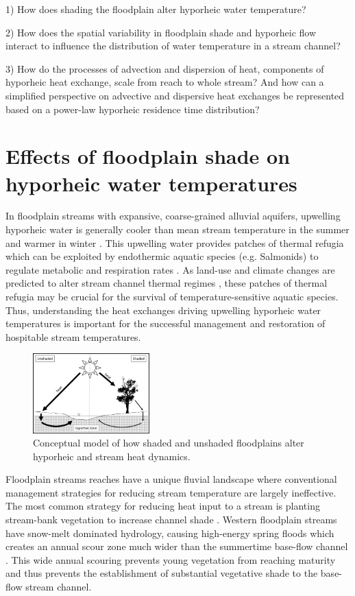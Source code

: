 \documentclass[a4paper]{article}
\begin{document}
1) How does shading the floodplain alter hyporheic water temperature? 

2) How does the spatial variability in floodplain shade and hyporheic flow interact to influence the distribution of water temperature in a stream channel?

3) How do the processes of advection and dispersion of heat, components of hyporheic heat exchange, scale from reach to whole stream? And how can a simplified perspective on advective and dispersive heat exchanges  be represented based on a power-law hyporheic residence time distribution?

\section{Effects of floodplain shade on hyporheic water temperatures}

In floodplain streams with expansive, coarse-grained alluvial aquifers, upwelling hyporheic water is generally cooler than mean stream temperature in the summer and warmer in winter \parencite{Arrigoni2008BufferedChannels}. This upwelling water provides patches of thermal refugia which can be exploited by endothermic aquatic species (e.g. Salmonids) to regulate metabolic and respiration rates \parencite{Hauer2016Gravel-bedLandscapes}. As land-use and climate changes are predicted to alter stream channel thermal regimes \parencite{Isaak2017TheStreams}, these patches of thermal refugia may be crucial for the survival of temperature-sensitive aquatic species. Thus, understanding the heat exchanges driving upwelling hyporheic water temperatures is important for the successful management and restoration of hospitable stream temperatures.

\begin{figure}
\centering
\includegraphics[width=0.4\textwidth]{ShadedAndUnshadedConceptModel.png}
\caption{\label{fig:One} Conceptual model of how shaded and unshaded floodplains alter hyporheic and stream heat dynamics.}
\end{figure}

Floodplain streams reaches have a unique fluvial landscape where conventional management strategies for reducing stream temperature are largely ineffective. The most common strategy for reducing heat input to a stream is planting stream-bank vegetation to increase channel shade \parencite{Beschta1997RiparianPerspective}. Western floodplain streams have snow-melt dominated hydrology, causing high-energy spring floods which creates an annual scour zone much wider than the summertime base-flow channel \parencite{Whited2007ClimatePattern}. This wide annual scouring prevents young vegetation from reaching maturity and thus prevents the establishment of substantial vegetative shade to the base-flow stream channel.
\end{document}
